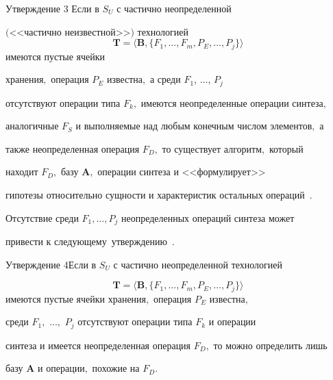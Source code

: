 \begin{newthm}{Утверждение 3} Если в $S_{U}$ с частично неопределенной

$($<<частично не\-из\-вест\-ной>>$)$ технологией $$\mathbf{T} = \langle \mathbf{B},

\{F_{1},\ldots, F_{m}, P_{E},\ldots, P_{j}\} \rangle$$ имеются пустые ячейки

хранения$,$ операция $P_{E}$ известна$,$ а среди $F_{1}$, $\ldots$, $P_{j}$

отсутствуют операции типа $F_{k},$ имеются неопределенные операции син\-те\-за$,$

аналогичные $F_{S}$ и выполняемые над любым конечным числом элементов$,$ а

также неопределенная операция $F_{D},$ то существует алгоритм$,$ который

находит $F_{D},$ базу $\mathbf{A},$ операции синтеза и <<формулирует>>

гипотезы относительно сущности и характеристик остальных операций~\rm\cite{krylov:bib3}.

\end{newthm}



\smallskip



Отсутствие среди $F_{1},\ldots, P_{j}$ неопределенных операций синтеза может

привести к следующему~утверждению~\cite{krylov:bib3}.



\smallskip



\begin{newthm}{Утверждение 4}Если в $S_{U}$ с частично неопределенной технологией

$$\mathbf{T} = \langle \mathbf{B}, \{F_{1},\ldots, F_{m}, P_{E},\ldots,

P_{j}\}\rangle$$ имеются пустые ячейки хранения$,$ операция $P_{E}$ известна$,$

среди $F_{1},$ $\ldots,$ $P_{j}$ отсутствуют операции типа $F_{k}$ и операции

син\-те\-за и имеется неопределенная операция $F_{D},$ то можно определить лишь

базу $\mathbf{A}$ и операции$,$ похожие на $F_{D}.$

\end{newthm}



\smallskip



